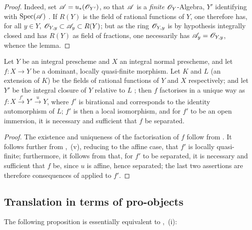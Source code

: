 \begin{proof}
Indeed, set $\mathscr{A}=u_*(\mathscr{O}_{Y'})$, so that $\mathscr{A}$ is a \emph{finite} $\mathscr{O}_Y$-Algebra, $Y'$ identifying with $\operatorname{Spec}(\mathscr{A})$ .
If $R(Y)$ is the field of rational functions of $Y$, one therefore has, for all $y\in Y$, $\mathscr{O}_{Y,y}\subset\mathscr{A}_y\subset R(Y)$; but as the ring $\mathscr{O}_{Y,y}$ is by hypothesis integrally closed and has $R(Y)$ as field of fractions, one necessarily has $\mathscr{A}_y=\mathscr{O}_{Y,y}$, whence the lemma.
\end{proof}

\begin{corollary}[8.12.11]
\label{IV.8.12.11}
Let $Y$ be an integral prescheme and $X$ an integral normal prescheme, and let $f:X\to Y$ be a dominant, locally quasi-finite morphism.
Let $K$ and $L$ (an extension of $K$) be the fields of rational functions of $Y$ and $X$ respectively; and let $Y'$ be the integral closure of $Y$ relative to $L$ ; then $f$ factorises in a unique way as $f:X\xrightarrow{f'}Y'\xrightarrow{u}Y$, where $f'$ is birational and corresponds to the identity automorphism of $L$; $f'$ is then a local isomorphism, and for $f'$ to be an open immersion, it is necessary and sufficient that $f$ be separated.
\end{corollary}

\begin{proof}
The existence and uniqueness of the factorisation of $f$ follow from .
It follows further from ,~(v), reducing to the affine case, that $f'$ is locally quasi-finite; furthermore, it follows from  that, for $f'$ to be separated, it is necessary and sufficient that $f$ be, since $u$ is affine, hence separated; the last two assertions are therefore consequences of  applied to $f'$.
\end{proof}


\subsection{Translation in terms of pro-objects}
\label{subsection:IV.8.13}

The following proposition is essentially equivalent to ,~(i):

